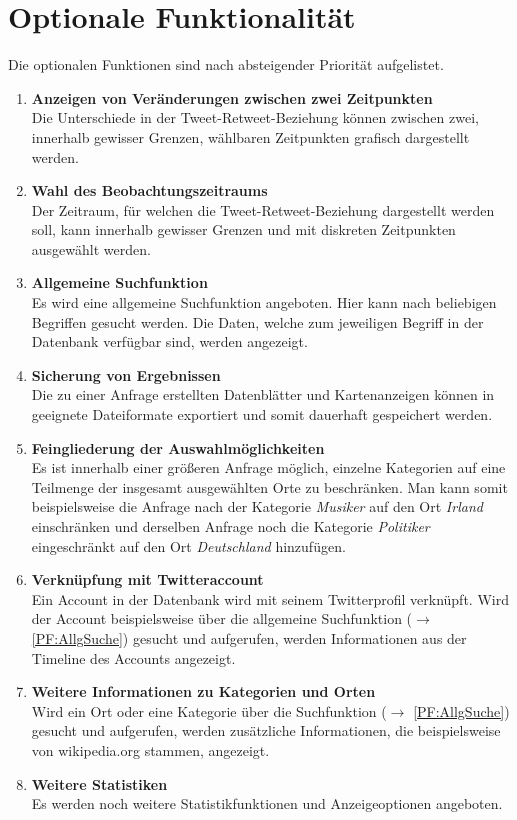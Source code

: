 \section{Optionale Funktionalität}
Die optionalen Funktionen sind nach absteigender Priorität aufgelistet.
\begin{enumerate}[ align=left, label={\textbf{\textbackslash F50\arabic*0\textbackslash}}]
	\item \textbf{Anzeigen von Veränderungen  zwischen zwei Zeitpunkten} \label{PF:Diff} \\
	Die Unterschiede in der Tweet-Retweet-Beziehung können zwischen zwei, innerhalb gewisser Grenzen, wählbaren Zeitpunkten grafisch dargestellt werden.
	\item \textbf{Wahl des Beobachtungszeitraums} \label{PF:WahlZeitraum} \\
	Der Zeitraum, für welchen die Tweet-Retweet-Beziehung dargestellt werden soll, kann innerhalb gewisser Grenzen und mit diskreten Zeitpunkten ausgewählt werden.
	\item \textbf{Allgemeine Suchfunktion} \label{PF:AllgSuche} \\
	Es wird eine allgemeine Suchfunktion angeboten. Hier kann nach beliebigen Begriffen gesucht werden. Die  Daten, welche zum jeweiligen Begriff in der Datenbank verfügbar sind, werden angezeigt.
	\item  \textbf{Sicherung von Ergebnissen} \label{PF:Sicherung} \\
	Die zu einer Anfrage erstellten Datenblätter und Kartenanzeigen können in geeignete Dateiformate exportiert und somit dauerhaft gespeichert werden.
	\item \textbf{Feingliederung der Auswahlmöglichkeiten} \\
	Es ist innerhalb einer größeren Anfrage möglich, einzelne Kategorien auf eine Teilmenge der insgesamt ausgewählten Orte zu beschränken. Man kann somit beispielsweise die Anfrage nach der Kategorie \emph{Musiker} auf den Ort \emph{Irland} einschränken und  derselben Anfrage noch die Kategorie \emph{Politiker} eingeschränkt auf den Ort \emph{Deutschland} hinzufügen.
	\item \textbf{Verknüpfung mit Twitteraccount} \label{PF:Verknuepfung} \\
	Ein Account in der Datenbank wird mit seinem Twitterprofil verknüpft. Wird der Account beispielsweise über die allgemeine Suchfunktion ($\rightarrow$ \ref{PF:AllgSuche}) gesucht und aufgerufen, werden Informationen aus der Timeline des Accounts angezeigt. 
	\item \textbf{Weitere Informationen zu Kategorien und Orten} \label{PF:WeiterInfos} \\
	Wird ein Ort oder eine Kategorie über die Suchfunktion ($\rightarrow$ \ref{PF:AllgSuche}) gesucht und aufgerufen, werden zusätzliche Informationen, die beispielsweise von wikipedia.org stammen, angezeigt.
	
	\item \textbf{Weitere Statistiken} \label{PF:Statistiken} \\
	Es werden noch weitere Statistikfunktionen und Anzeigeoptionen angeboten.
\end{enumerate}
